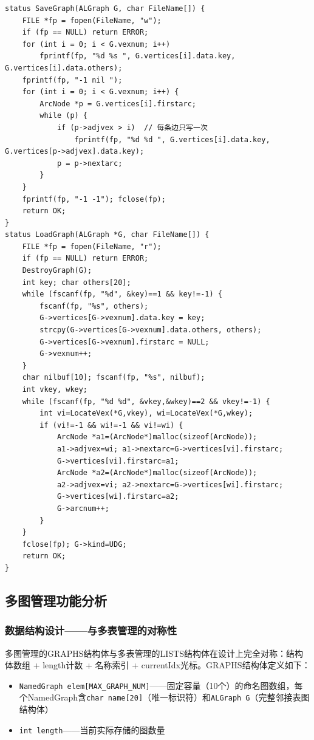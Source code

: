 \documentclass[supercite]{Experimental_Report}
\begin{document}
{\begin{lstlisting}[label={lst:save-graph}, caption={SaveGraph与LoadGraph}]
status SaveGraph(ALGraph G, char FileName[]) {
    FILE *fp = fopen(FileName, "w");
    if (fp == NULL) return ERROR;
    for (int i = 0; i < G.vexnum; i++)
        fprintf(fp, "%d %s ", G.vertices[i].data.key, G.vertices[i].data.others);
    fprintf(fp, "-1 nil ");
    for (int i = 0; i < G.vexnum; i++) {
        ArcNode *p = G.vertices[i].firstarc;
        while (p) {
            if (p->adjvex > i)  // 每条边只写一次
                fprintf(fp, "%d %d ", G.vertices[i].data.key, G.vertices[p->adjvex].data.key);
            p = p->nextarc;
        }
    }
    fprintf(fp, "-1 -1"); fclose(fp);
    return OK;
}
status LoadGraph(ALGraph *G, char FileName[]) {
    FILE *fp = fopen(FileName, "r");
    if (fp == NULL) return ERROR;
    DestroyGraph(G);
    int key; char others[20];
    while (fscanf(fp, "%d", &key)==1 && key!=-1) {
        fscanf(fp, "%s", others);
        G->vertices[G->vexnum].data.key = key;
        strcpy(G->vertices[G->vexnum].data.others, others);
        G->vertices[G->vexnum].firstarc = NULL;
        G->vexnum++;
    }
    char nilbuf[10]; fscanf(fp, "%s", nilbuf);
    int vkey, wkey;
    while (fscanf(fp, "%d %d", &vkey,&wkey)==2 && vkey!=-1) {
        int vi=LocateVex(*G,vkey), wi=LocateVex(*G,wkey);
        if (vi!=-1 && wi!=-1 && vi!=wi) {
            ArcNode *a1=(ArcNode*)malloc(sizeof(ArcNode));
            a1->adjvex=wi; a1->nextarc=G->vertices[vi].firstarc;
            G->vertices[vi].firstarc=a1;
            ArcNode *a2=(ArcNode*)malloc(sizeof(ArcNode));
            a2->adjvex=vi; a2->nextarc=G->vertices[wi].firstarc;
            G->vertices[wi].firstarc=a2;
            G->arcnum++;
        }
    }
    fclose(fp); G->kind=UDG;
    return OK;
}
\end{lstlisting}
\newpage


\subsection{多图管理功能分析}

\subsubsection{数据结构设计——与多表管理的对称性}

多图管理的GRAPHS结构体与多表管理的LISTS结构体在设计上完全对称：结构体数组 + length计数 + 名称索引 + currentIdx光标。GRAPHS结构体定义如下：
\begin{itemize}
    \item \texttt{NamedGraph elem[MAX\_GRAPH\_NUM]}——固定容量（10个）的命名图数组，每个NamedGraph含\texttt{char name[20]}（唯一标识符）和\texttt{ALGraph G}（完整邻接表图结构体）
    \item \texttt{int length}——当前实际存储的图数量
\end{itemize}

}
\end{document}
